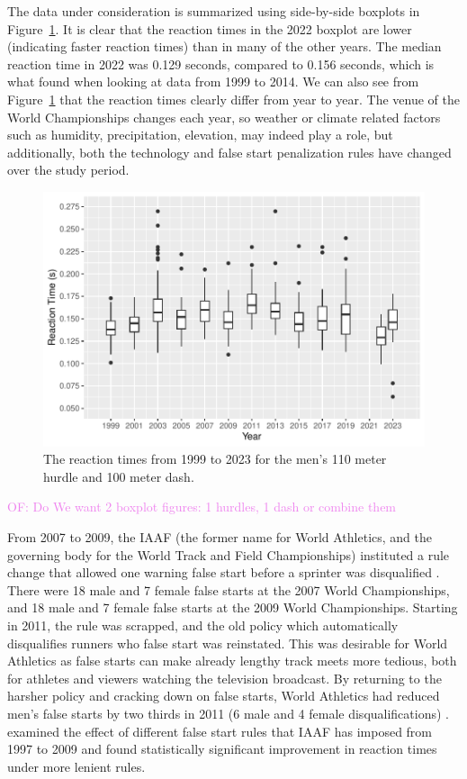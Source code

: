 \documentclass[12pt, letterpaper]{article}
\newcommand{\of}[1]{\textcolor{violet}{OF: #1}}
\begin{document}
The data under consideration is summarized using side-by-side boxplots in 
Figure~\ref{fig:Boxplot}. It is clear that the reaction times in the 2022
boxplot are lower (indicating faster reaction times) than in many of the other
years. The median reaction time in 2022 was 0.129 seconds,  compared to 0.156
seconds, which is what \citet{brosnan2017effects} found when looking at data
from 1999 to 2014. We can also see from Figure~\ref{fig:Boxplot} that the 
reaction times clearly differ from year to year. The venue of the World 
Championships changes each year, so weather or climate related factors such as 
humidity, precipitation, elevation, may indeed play a role, but additionally,
both the technology and false start penalization rules have changed over the 
study period.


\begin{figure}[tbp]
  \centering
  \includegraphics{Boxplot}
  \caption{The reaction times from 1999 to 2023 for the men's 110 meter hurdle
  and 100 meter dash.}
  \label{fig:Boxplot}
\end{figure}
\of{Do We want 2 boxplot figures: 1 hurdles, 1 dash or combine them}

From 2007 to 2009, the IAAF (the former name for World Athletics, and the 
governing body for the World Track and Field Championships) instituted a rule 
change that allowed one warning false start before a sprinter was disqualified 
\citep{iaaf2009falsestart}. There were 18 male and 7 female false starts at the 
2007 World Championships, and 18 male and 7 female false starts at the 2009 World 
Championships. Starting in 2011, the rule was scrapped, and the old policy which
automatically disqualifies runners who false start was reinstated. This was 
desirable for World Athletics as false starts can make already lengthy track 
meets more tedious, both for athletes and viewers watching the television 
broadcast. By returning to the harsher policy and cracking down on false starts,
World Athletics had reduced men's false starts by two thirds in 2011 (6 male and
4 female disqualifications) \citep{iaaf2009falsestart}. \citet{haugen2013effect}
examined the effect of different false start rules that IAAF has imposed from 
1997 to 2009 and found statistically significant improvement in reaction times 
under more lenient rules.
\end{document}
